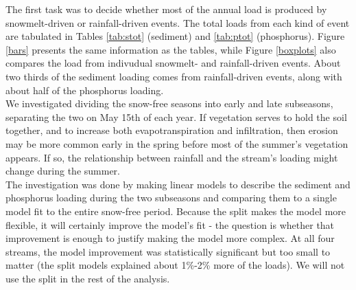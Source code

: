 \documentclass[12pt]{article}
\begin{document}
The first task was to decide whether most of the annual load is produced by snowmelt-driven or rainfall-driven events. The total loads from each kind of event are tabulated in Tables \ref{tab:stot} (sediment) and \ref{tab:ptot} (phosphorus). Figure \ref{bars} presents the same information as the tables, while Figure \ref{boxplots} also compares the load from indivudual snowmelt- and rainfall-driven events. About two thirds of the sediment loading comes from rainfall-driven events, along with about half of the phosphorus loading.\\

We investigated dividing the snow-free seasons into early and late subseasons, separating the two on May 15th of each year. If vegetation serves to hold the soil together, and to increase both evapotranspiration and infiltration, then erosion may be more common early in the spring before most of the summer's vegetation appears. If so, the relationship between rainfall and the stream's loading might change during the summer.\\

The investigation was done by making linear models to describe the sediment and phosphorus loading during the two subseasons and comparing them to a single model fit to the entire snow-free period. Because the split makes the model more flexible, it will certainly improve the model's fit - the question is whether that improvement is enough to justify making the model more complex. At all four streams, the model improvement was statistically significant but too small to matter (the split models explained about 1\%-2\% more of the loads). We will not use the split in the rest of the analysis.\\
\end{document}
